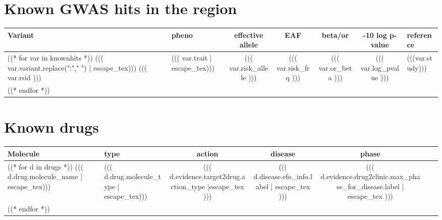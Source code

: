 \documentclass{article}
\begin{document}
\newpage

\section{ Known GWAS hits in the region}
\begin{longtable}{ >{\RaggedRight}p{3cm}|L{3cm}|c|c|c|c|>{\RaggedRight}p{3cm} }
Variant & pheno & effective allele & EAF & beta/or & -10 log p-value & reference \\
\hline
((* for var in knownhits *))
((( var.variant.replace(":"," ") | escape_tex))) \newline ((( var.rsid ))) & ((( var.trait | escape_tex))) & ((( var.risk_allele ))) & ((( var.risk_frq ))) & ((( var.or_beta ))) & ((( var.log_pvalue ))) & (((var.study))) \\
((* endfor *))
\end{longtable}



\newpage

\section{ Known drugs }
\begin{longtable}{ >{\RaggedRight}p{3cm}|L{3cm}|c|c|c|c|>{\RaggedRight}p{3cm} }
Molecule & type & action & disease & phase \\
\hline
((* for d in drugs *))
((( d.drug.molecule_name | escape_tex))) & ((( d.drug.molecule_type | escape_tex))) & ((( d.evidence.target2drug.action_type |escape_tex ))) & ((( d.disease.efo_info.label | escape_tex ))) & ((( d.evidence.drug2clinic.max_phase_for_disease.label | escape_tex ))) \\
((* endfor *))
\end{longtable}
\endgroup
\end{document}
